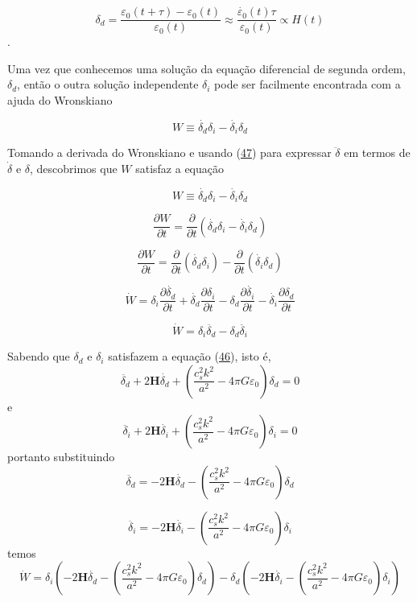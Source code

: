\documentclass[a4paper,12pt]{article}
\begin{document}
$$\delta_d = \dfrac{\varepsilon_0 (t+ \tau) -\varepsilon_0 (t) }{\varepsilon_0 (t)} \approx \dfrac{\dot{\varepsilon_0} (t)\tau }{\varepsilon_0 (t)} \propto H(t)$$.

Uma vez que conhecemos uma solução da equação diferencial de segunda ordem, $\delta_d$, então o
outra solução independente $\delta_i$ pode ser facilmente encontrada com a ajuda do Wronskiano

\begin{equation}\label{eq51}
	W \equiv \dot{\delta_d} \delta_i - \dot{\delta_i} \delta_d
\end{equation}

Tomando a derivada do Wronskiano e usando (\hyperref[eq47]{47}) para expressar $\ddot{\delta}$ em termos de $\dot{\delta}$ e $\delta$, descobrimos que $W$ satisfaz a equação


$$W \equiv \dot{\delta_d} \delta_i - \dot{\delta_i} \delta_d$$

$$\dfrac{\partial W }{\partial t}= \dfrac{\partial  }{\partial t}\left(\dot{\delta_d} \delta_i - \dot{\delta_i} \delta_d \right)$$

$$\dfrac{\partial W }{\partial t}= \dfrac{\partial  }{\partial t}\left(\dot{\delta_d} \delta_i  \right)-\dfrac{\partial  }{\partial t}\left(\dot{\delta_i} \delta_d \right)$$

$$\dot{W}= \delta_i\dfrac{\partial  \dot{\delta_d}}{\partial t}+\dot{\delta_d}\dfrac{\partial \delta_i }{\partial t}-\delta_d\dfrac{\partial  \dot{\delta_i} }{\partial t}-\dot{\delta_i}\dfrac{\partial \delta_d }{\partial t}$$

$$\dot{W}= \delta_i\ddot{\delta_d}-\delta_d\ddot{\delta_i}$$

Sabendo que $\delta_d$ e $\delta_i$ satisfazem a equação (\hyperref[eq46]{46}), isto é,
$$\ddot{\delta_d} + 2\mathbf{H}\dot{\delta_d} + \left( \dfrac{c^2_s k^2}{a^2} -4\pi G\varepsilon_0\right)\delta_d = 0 $$
e
$$\ddot{\delta_i} + 2\mathbf{H}\dot{\delta_i} + \left( \dfrac{c^2_s k^2}{a^2} -4\pi G\varepsilon_0\right)\delta_i = 0$$
portanto substituindo 
$$\ddot{\delta_d} = - 2\mathbf{H}\dot{\delta_d} - \left( \dfrac{c^2_s k^2}{a^2} -4\pi G\varepsilon_0\right)\delta_d  $$

$$\ddot{\delta_i}  = - 2\mathbf{H}\dot{\delta_i} - \left( \dfrac{c^2_s k^2}{a^2} -4\pi G\varepsilon_0\right)\delta_i$$
temos
$$\dot{W}= \delta_i\left(- 2\mathbf{H}\dot{\delta_d} - \left( \dfrac{c^2_s k^2}{a^2} -4\pi G\varepsilon_0\right)\delta_d  \right)-\delta_d\left( - 2\mathbf{H}\dot{\delta_i} - \left( \dfrac{c^2_s k^2}{a^2} -4\pi G\varepsilon_0\right)\delta_i\right)$$
\end{document}
